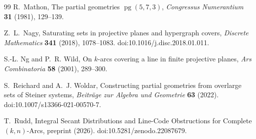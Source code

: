 \documentclass[11pt]{article}
\theoremstyle{definition}
\theoremstyle{remark}
\begin{document}
\begin{thebibliography}{99}
R.~Mathon,
\newblock The partial geometries $\operatorname{pg}(5,7,3)$,
\newblock \emph{Congressus Numerantium} \textbf{31} (1981), 129--139.

Z.~L.~Nagy,
\newblock Saturating sets in projective planes and hypergraph covers,
\newblock \emph{Discrete Mathematics} \textbf{341} (2018), 1078--1083.
\newblock doi:10.1016/j.disc.2018.01.011.

S.-L. Ng and P.~R. Wild,
\newblock On $k$-arcs covering a line in finite projective planes,
\newblock \emph{Ars Combinatoria} \textbf{58} (2001), 289--300.

S.~Reichard and A.~J. Woldar,
\newblock Constructing partial geometries from overlarge sets of Steiner
systems,
\newblock \emph{Beitr\"age zur Algebra und Geometrie} \textbf{63} (2022).
\newblock doi:10.1007/s13366-021-00570-7.

T.~Rudd,
\newblock Integral Secant Distributions and Line-Code Obstructions for
Complete \((k,n)\)-Arcs,
\newblock preprint (2026).
\newblock doi:10.5281/zenodo.22087679.

\end{thebibliography}
\end{document}
